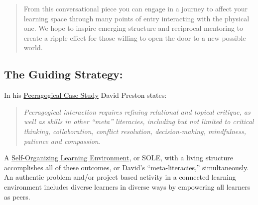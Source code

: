 %
\begin{quote}
From this conversational piece you can engage in a journey to affect
your learning space through many points of entry interacting with the
physical one.  We hope to inspire emerging structure and reciprocal
mentoring to create a ripple effect for those willing to open the door
to a new possible world.
\end{quote}

\subsection{The Guiding Strategy:}

In his \href{http://peeragogy.org/case-study-5ph1nx/}{Peeragogical Case
Study} David Preston states:

\begin{quote}
\emph{Peeragogical interaction requires refining relational and topical
critique, as well as skills in other ``meta'' literacies, including but
not limited to critical thinking, collaboration, conflict resolution,
decision-making, mindfulness, patience and compassion.} 
\end{quote}

A
\href{http://en.wikipedia.org/wiki/Self\_Organised\_Learning\_Environment}{Self-Organizing
Learning Environment}, or SOLE, with a living structure accomplishes all
of these outcomes, or David's ``meta-literacies,'' simultaneously.
An authentic problem and/or project based activity in a
connected learning environment includes diverse learners in diverse ways
by empowering all learners as peers.

